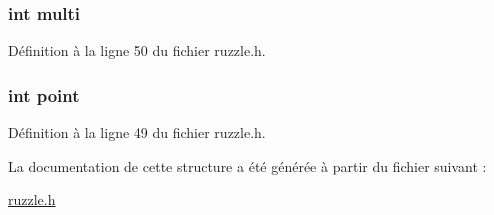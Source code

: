 \subsubsection[{multi}]{\setlength{\rightskip}{0pt plus 5cm}int multi}\label{structt__score_a75308cd0de4d855ff6cb9baec37dddde}


Définition à la ligne 50 du fichier ruzzle.\+h.

\hypertarget{structt__score_a2dee8b7fcecc7c2d190e9304b43ea886}{}
\subsubsection[{point}]{\setlength{\rightskip}{0pt plus 5cm}int point}\label{structt__score_a2dee8b7fcecc7c2d190e9304b43ea886}


Définition à la ligne 49 du fichier ruzzle.\+h.



La documentation de cette structure a été générée à partir du fichier suivant \+:\begin{DoxyCompactItemize}
\item 
\hyperlink{ruzzle_8h}{ruzzle.\+h}\end{DoxyCompactItemize}
